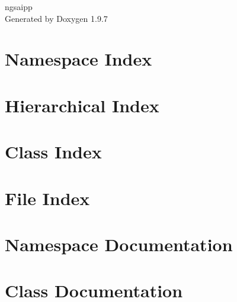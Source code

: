 \documentclass[twoside]{book}
\newcommand{\+}{\discretionary{\mbox{\scriptsize$\hookleftarrow$}}{}{}}
\newcommand{\clearemptydoublepage}{%
    \newpage{\pagestyle{empty}\cleardoublepage}%
  }
\begin{document}
  \raggedbottom
    \hypersetup{pageanchor=false,
                bookmarksnumbered=true,
                pdfencoding=unicode
               }
  \begin{titlepage}
  \vspace*{7cm}
  \begin{center}%
  {\Large ngsaipp}\\
  \vspace*{1cm}
  {\large Generated by Doxygen 1.9.7}\\
  \end{center}
  \end{titlepage}
  \clearemptydoublepage
  \tableofcontents
  \clearemptydoublepage
  \hypersetup{pageanchor=true}
\chapter{Namespace Index}

\chapter{Hierarchical Index}

\chapter{Class Index}

\chapter{File Index}

\chapter{Namespace Documentation}




\chapter{Class Documentation}



















\end{document}
